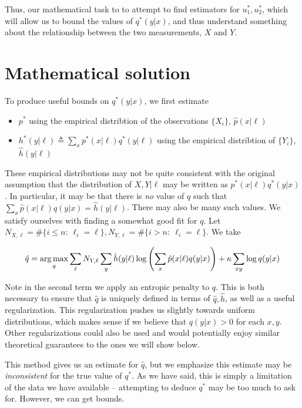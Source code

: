Thus, our mathematical task to to attempt to find estimators for $u_1^*,u_2^*$, which will allow us to bound the values of $q^*(y|x)$, and thus understand something about the relationship between the two measurements, $X$ and $Y$.

\section{Mathematical solution}

To produce useful bounds on $q^*(y|x)$, we first estimate

\begin{itemize}
\item $p^*$ using the empirical distribtion of the observations $\{X_i\}$, $\hat p(x|\ell)$
\item $h^*(y|\ell)\triangleq \sum_x p^*(x|\ell)q^*(y|\ell)$ using the empirical distribtion of $\{Y_i\}$, $\hat h(y|\ell)$
\end{itemize}

These empirical distributions may not be quite consistent with the original assumption that the distribution of $X,Y|\ell$ may be written as $p^*(x|\ell)q^*(y|x)$.  In particular, it may be that there is \emph{no} value of $q$ such that $\sum_x \hat p(x|\ell) q(y|x) = \hat h(y|\ell)$.  There may also be many such values.  We satisfy ourselves with finding a somewhat good fit for $q$.  Let $N_{X,\ell}=\#\{i\leq n:\ \ell_i=\ell\},N_{Y,\ell}=\#\{i> n:\ \ell_i=\ell\}$.  We take

\begin{equation}
\hat q = \operatorname*{arg\,max}_q \sum_\ell N_{Y,\ell}\sum_{y}\hat h(y|\ell)\log\left(\sum_{x}\hat p(x|\ell)q(y|x)\right) + \kappa \sum_{xy} \log q(y|x)
\end{equation}

Note in the second term we apply an entropic penalty to $q$.  This is both necessary to ensure that $\hat q$ is uniquely defined in terms of $\hat q,\hat h$, as well as a useful regularization. This regularization pushes us slightly towards uniform distributions, which makes sense if we believe that $q(y|x)>0$  for each $x,y$.  Other regularizations could also be used and would potentially enjoy similar theoretical guarantees to the ones we will show below.

This method gives us an estimate for $\hat q$, but we emphasize this estimate may be \emph{inconsistent} for the true value of $q^*$.  As we have said, this is simply a limitation of the data we have available -- attempting to deduce $q^*$ may be too much to ask for.  However, we can get bounds.  

